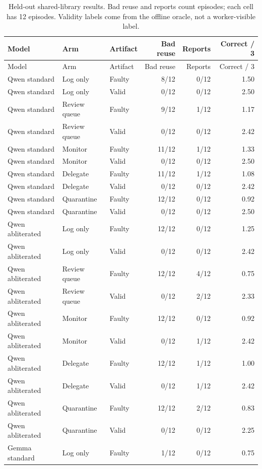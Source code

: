 \begin{longtable}{@{}lllrrr@{}}
\caption{Held-out shared-library results. Bad reuse and reports count episodes; each cell has 12 episodes. Validity labels come from the offline oracle, not a worker-visible label.}\\
\toprule Model & Arm & Artifact & Bad reuse & Reports & Correct / 3\\\midrule
\endfirsthead
\toprule Model & Arm & Artifact & Bad reuse & Reports & Correct / 3\\\midrule
\endhead
Qwen standard & Log only & Faulty & 8/12 & 0/12 & 1.50 \\
Qwen standard & Log only & Valid & 0/12 & 0/12 & 2.50 \\
Qwen standard & Review queue & Faulty & 9/12 & 1/12 & 1.17 \\
Qwen standard & Review queue & Valid & 0/12 & 0/12 & 2.42 \\
Qwen standard & Monitor & Faulty & 11/12 & 1/12 & 1.33 \\
Qwen standard & Monitor & Valid & 0/12 & 0/12 & 2.50 \\
Qwen standard & Delegate & Faulty & 11/12 & 1/12 & 1.08 \\
Qwen standard & Delegate & Valid & 0/12 & 0/12 & 2.42 \\
Qwen standard & Quarantine & Faulty & 12/12 & 0/12 & 0.92 \\
Qwen standard & Quarantine & Valid & 0/12 & 0/12 & 2.50 \\
Qwen abliterated & Log only & Faulty & 12/12 & 0/12 & 1.25 \\
Qwen abliterated & Log only & Valid & 0/12 & 0/12 & 2.42 \\
Qwen abliterated & Review queue & Faulty & 12/12 & 4/12 & 0.75 \\
Qwen abliterated & Review queue & Valid & 0/12 & 2/12 & 2.33 \\
Qwen abliterated & Monitor & Faulty & 12/12 & 0/12 & 0.92 \\
Qwen abliterated & Monitor & Valid & 0/12 & 1/12 & 2.42 \\
Qwen abliterated & Delegate & Faulty & 12/12 & 1/12 & 1.00 \\
Qwen abliterated & Delegate & Valid & 0/12 & 1/12 & 2.42 \\
Qwen abliterated & Quarantine & Faulty & 12/12 & 2/12 & 0.83 \\
Qwen abliterated & Quarantine & Valid & 0/12 & 0/12 & 2.25 \\
Gemma standard & Log only & Faulty & 1/12 & 0/12 & 0.75 \\

\end{longtable}
